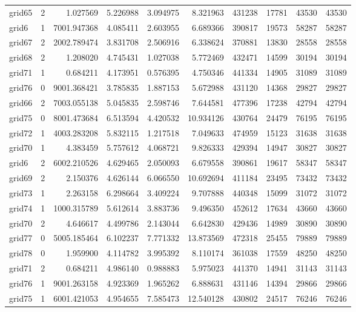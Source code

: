 \begin{longtable}{|l|r|r|r|r|r|r|r|r|r|}
grid65 & 2 & 1.027569 & 5.226988 & 3.094975 & 8.321963 & 431238 & 17781 & 43530 & 43530 \\
grid6 & 1 & 7001.947368 & 4.085411 & 2.603955 & 6.689366 & 390817 & 19573 & 58287 & 58287 \\
grid67 & 2 & 2002.789474 & 3.831708 & 2.506916 & 6.338624 & 370881 & 13830 & 28558 & 28558 \\
grid68 & 2 & 1.208020 & 4.745431 & 1.027038 & 5.772469 & 432471 & 14599 & 30194 & 30194 \\
grid71 & 1 & 0.684211 & 4.173951 & 0.576395 & 4.750346 & 441334 & 14905 & 31089 & 31089 \\
grid76 & 0 & 9001.368421 & 3.785835 & 1.887153 & 5.672988 & 431120 & 14368 & 29827 & 29827 \\
grid66 & 2 & 7003.055138 & 5.045835 & 2.598746 & 7.644581 & 477396 & 17238 & 42794 & 42794 \\
grid75 & 0 & 8001.473684 & 6.513594 & 4.420532 & 10.934126 & 430764 & 24479 & 76195 & 76195 \\
grid72 & 1 & 4003.283208 & 5.832115 & 1.217518 & 7.049633 & 474959 & 15123 & 31638 & 31638 \\
grid70 & 1 & 4.383459 & 5.757612 & 4.068721 & 9.826333 & 429394 & 14947 & 30827 & 30827 \\
grid6 & 2 & 6002.210526 & 4.629465 & 2.050093 & 6.679558 & 390861 & 19617 & 58347 & 58347 \\
grid69 & 2 & 2.150376 & 4.626144 & 6.066550 & 10.692694 & 411184 & 23495 & 73432 & 73432 \\
grid73 & 1 & 2.263158 & 6.298664 & 3.409224 & 9.707888 & 440348 & 15099 & 31072 & 31072 \\
grid74 & 1 & 1000.315789 & 5.612614 & 3.883736 & 9.496350 & 452612 & 17634 & 43660 & 43660 \\
grid70 & 2 & 4.646617 & 4.499786 & 2.143044 & 6.642830 & 429436 & 14989 & 30890 & 30890 \\
grid77 & 0 & 5005.185464 & 6.102237 & 7.771332 & 13.873569 & 472318 & 25455 & 79889 & 79889 \\
grid78 & 0 & 1.959900 & 4.114782 & 3.995392 & 8.110174 & 361038 & 17559 & 48250 & 48250 \\
grid71 & 2 & 0.684211 & 4.986140 & 0.988883 & 5.975023 & 441370 & 14941 & 31143 & 31143 \\
grid76 & 1 & 9001.263158 & 4.923369 & 1.965262 & 6.888631 & 431146 & 14394 & 29866 & 29866 \\
grid75 & 1 & 6001.421053 & 4.954655 & 7.585473 & 12.540128 & 430802 & 24517 & 76246 & 76246 \\

\end{longtable}
